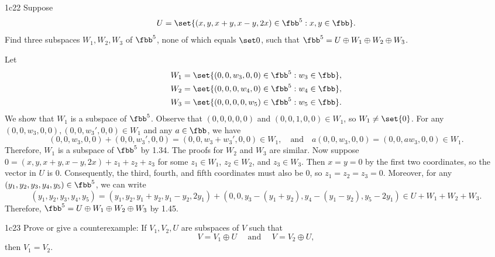 \begin{exercise}{1c22}
    Suppose
    \[
    	U = \set{(x, y, x + y, x - y, 2x) \in \fbb^5 : x, y \in \fbb}.
    \]
    Find three subspaces $W_1, W_2, W_3$ of $\fbb^5$, none of which equals $\set 0$, such that $\fbb^5 = U \oplus W_1 \oplus W_2 \oplus W_3$.
\end{exercise}

\begin{sol}
    Let
    \begin{align*}
        W_1 &= \set{(0, 0, w_3, 0, 0) \in \fbb^5 : w_3 \in \fbb}, \\
        W_2 &= \set{(0, 0, 0, w_4, 0) \in \fbb^5 : w_4 \in \fbb}, \\
        W_3 &= \set{(0, 0, 0, 0, w_5) \in \fbb^5 : w_5 \in \fbb}.
    \end{align*}
    We show that $W_1$ is a subspace of $\fbb^5$.
    Observe that $(0, 0, 0, 0, 0)$ and $(0, 0, 1, 0, 0) \in W_1$, so $W_1 \neq \set{0}$.
    For any $(0, 0, w_3, 0, 0), (0, 0, w_3', 0, 0) \in W_1$ and any $a \in \fbb$, we have
    \[
        (0, 0, w_3, 0, 0) + (0, 0, w_3', 0, 0) = (0, 0, w_3 + w_3', 0, 0) \in W_1, \quad \text{and} \quad a(0, 0, w_3, 0, 0) = (0, 0, aw_3, 0, 0) \in W_1.
    \]
    Therefore, $W_1$ is a subspace of $\fbb^5$ by 1.34.
    The proofs for $W_2$ and $W_3$ are similar.
    Now suppose $0 = (x, y, x + y, x - y, 2x) + z_1 + z_2 + z_3$ for some $z_1 \in W_1$, $z_2 \in W_2$, and $z_3 \in W_3$.
    Then $x = y = 0$ by the first two coordinates, so the vector in $U$ is $0$.
    Consequently, the third, fourth, and fifth coordinates must also be $0$, so $z_1 = z_2 = z_3 = 0$.
    Moreover, for any $(y_1, y_2, y_3, y_4, y_5) \in \fbb^5$, we can write
    \[
        (y_1, y_2, y_3, y_4, y_5) = (y_1, y_2, y_1 + y_2, y_1 - y_2, 2y_1) + (0, 0, y_3 - (y_1 + y_2), y_4 - (y_1 - y_2), y_5 - 2y_1) \in U + W_1 + W_2 + W_3.
    \]
    Therefore, $\fbb^5 = U \oplus W_1 \oplus W_2 \oplus W_3$ by 1.45.
\end{sol}

\begin{exercise}{1c23}
    Prove or give a counterexample: If $V_1, V_2, U$ are subspaces of $V$ such that
    \[
    	V = V_1 \oplus U \quad \text{ and } \quad V = V_2 \oplus U,
    \]
    then $V_1 = V_2$.

\end{exercise}

